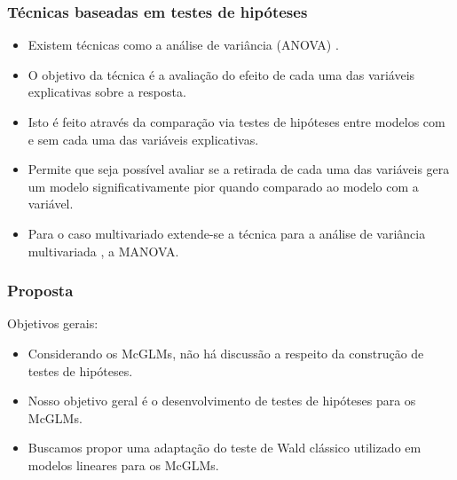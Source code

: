 \documentclass[10pt,
  aspectratio=169,
  serif,
  mathserif,
  professionalfont,
  compress,
  handout,
  ]{beamer}\usepackage[]{graphicx}\usepackage[]{color}
\begin{document}
\begin{frame}
  \frametitle{Técnicas baseadas em testes de hipóteses}

  \begin{itemize}
    \itemsep 2ex

  \item Existem técnicas como a análise de variância (ANOVA) \cite{anova_fisher}. 
  
  \item O objetivo da técnica é a avaliação do efeito de cada uma das variáveis explicativas sobre a resposta. 

  \item Isto é feito através da comparação via testes de hipóteses entre modelos com e sem cada uma das variáveis explicativas.

  \item Permite que seja possível avaliar se a retirada de cada uma das variáveis gera um modelo significativamente pior quando comparado ao modelo com a variável. 

  \item Para o caso multivariado extende-se a técnica para a análise de variância multivariada \cite{manova}, a MANOVA. 

  \end{itemize}

\end{frame}


\begin{frame}
  \frametitle{Proposta}

Objetivos gerais:

  \begin{itemize}
    \itemsep 2ex

  \item Considerando os McGLMs, não há discussão a respeito da construção de testes de hipóteses.
  
  \item Nosso objetivo geral é o desenvolvimento de testes de hipóteses para os McGLMs.

  \item Buscamos propor uma adaptação do teste de Wald clássico utilizado em modelos lineares para os McGLMs. 

  \end{itemize}

\end{frame}
\end{document}
